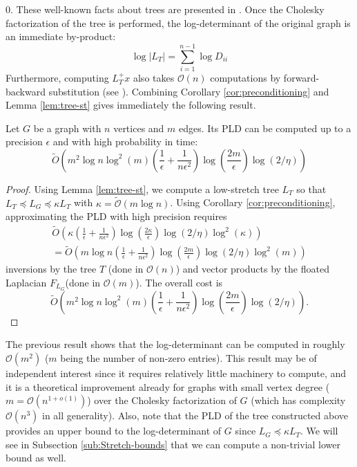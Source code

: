 $0$. These well-known facts about trees are presented in \cite{Spielman2009a}.
Once the Cholesky factorization of the tree is performed, the log-determinant
of the original graph is an immediate by-product: 
\[
\log\left|L_{T}\right|=\sum_{i=1}^{n-1}\log D_{ii}
\]
Furthermore, computing $L_{T}^{+}x$ also takes $\mathcal{O}\left(n\right)$
computations by forward-backward substitution (see \cite{duff1986direct}).
Combining Corollary \ref{cor:preconditioning} and Lemma \eqref{lem:tree-st}
gives immediately the following result. 
\begin{theorem}
\label{thm:PLD-tree}Let $G$ be a graph with $n$ vertices and $m$
edges. Its PLD can be computed up to a precision $\epsilon$ and with
high probability in time: 
\[
\tilde{O}\left(m^{2}\log n\log^{2}\left(m\right)\left(\frac{1}{\epsilon}+\frac{1}{n\epsilon^{2}}\right)\log\left(\frac{2m}{\epsilon}\right)\log\left(2/\eta\right)\right)
\]
\end{theorem}
\begin{proof}
Using Lemma \eqref{lem:tree-st}, we compute a low-stretch tree $L_{T}$
so that $L_{T}\preceq L_{G}\preceq\kappa L_{T}$ with $\kappa=\tilde{\mathcal{O}}\left(m\log n\right)$.
Using Corollary \eqref{cor:preconditioning}, approximating the PLD
with high precision requires 
\begin{eqnarray*}
\tilde{O}\left(\kappa\left(\frac{1}{\epsilon}+\frac{1}{n\epsilon^{2}}\right)\log\left(\frac{2\kappa}{\epsilon}\right)\log\left(2/\eta\right)\log^{2}\left(\kappa\right)\right)\\
=\tilde{O}\left(m\log n\left(\frac{1}{\epsilon}+\frac{1}{n\epsilon^{2}}\right)\log\left(\frac{2m}{\epsilon}\right)\log\left(2/\eta\right)\log^{2}\left(m\right)\right)
\end{eqnarray*}
inversions by the tree $T$ (done in $\mathcal{O}\left(n\right)$)
and vector products by the floated Laplacian $F_{L_{G}}$(done in
$\mathcal{O}\left(m\right)$). The overall cost is\[ \tilde{O}\left(m^{2}\log n\log^{2}\left(m\right)\left(\frac{1}{\epsilon}+\frac{1}{n\epsilon^{2}}\right)\log\left(\frac{2m}{\epsilon}\right)\log\left(2/\eta\right)\right).\]
\end{proof}
The previous result shows that the log-determinant can be computed
in roughly $\mathcal{O}\left(m^{2}\right)$ ($m$ being the number
of non-zero entries). This result may be of independent interest since
it requires relatively little machinery to compute, and it is a theoretical
improvement already for graphs with small vertex degree ($m=\mathcal{O}\left(n^{1+o\left(1\right)}\right)$)
over the Cholesky factorization of $G$ (which has complexity $\mathcal{O}\left(n^{3}\right)$
in all generality). Also, note that the PLD of the tree constructed
above provides an upper bound to the log-determinant of $G$ since
$L_{G}\preceq\kappa L_{T}$. We will see in Subsection \ref{sub:Stretch-bounds}
that we can compute a non-trivial lower bound as well. 
